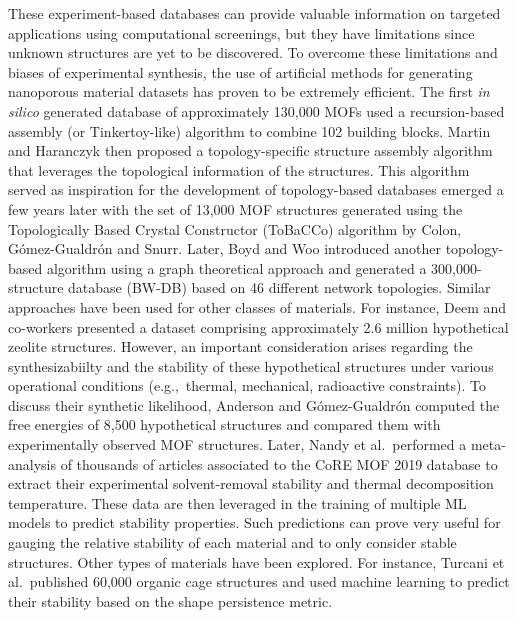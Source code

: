 \documentclass[main.tex]{subfiles}
\begin{document}
These experiment-based databases can provide valuable information on targeted applications using computational screenings, but they have limitations since unknown structures are yet to be discovered. To overcome these limitations and biases of experimental synthesis, the use of artificial methods for generating nanoporous material datasets has proven to be extremely efficient. The first \emph{in silico} generated database of approximately 130,000 MOFs used a recursion-based assembly (or Tinkertoy-like) algorithm to combine 102 building blocks.\autocite{Wilmer_2012} Martin and Haranczyk then proposed a topology-specific structure assembly algorithm that leverages the topological information of the structures.\autocite{Martin_2014} This algorithm served as inspiration for the development of topology-based databases emerged a few years later with the set of 13,000 MOF structures generated using the Topologically Based Crystal Constructor (ToBaCCo) algorithm by Colon, G{\'{o}}mez-Gualdr{\'{o}}n and Snurr.\autocite{Colon_2017} Later, Boyd and Woo introduced another topology-based algorithm using a graph theoretical approach and generated a 300,000-structure database (BW-DB) based on 46 different network topologies.\autocite{Boyd_2016} Similar approaches have been used for other classes of materials. For instance, Deem and co-workers presented a dataset comprising approximately 2.6 million hypothetical zeolite structures.\autocite{Earl_2006,Deem_2009,Pophale_2011} However, an important consideration arises regarding the synthesizabiilty and the stability of these hypothetical structures under various operational conditions (e.g.,\ thermal, mechanical, radioactive constraints). To discuss their synthetic likelihood, Anderson and G{\'{o}}mez-Gualdr{\'{o}}n computed the free energies of 8,500 hypothetical structures and compared them with experimentally observed MOF structures.\autocite{Anderson_2020} Later, Nandy et al.\ performed a meta-analysis of thousands of articles associated to the CoRE MOF 2019 database to extract their experimental solvent-removal stability and thermal decomposition temperature.\autocite{Nandy_2021} These data are then leveraged in the training of multiple ML models to predict stability properties. Such predictions can prove very useful for gauging the relative stability of each material and to only consider stable structures. Other types of materials have been explored. For instance, Turcani et al.\ published 60,000 organic cage structures and used machine learning to predict their stability based on the shape persistence metric.\autocite{Turcani_2018}
\end{document}
